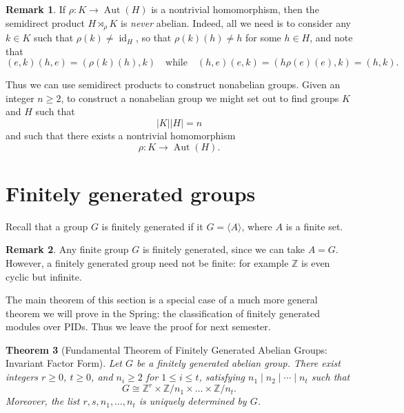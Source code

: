 \documentclass[12pt]{report}
\newtheorem{theorem}{Theorem}[chapter]
\numberwithin{equation}{section}
\numberwithin{theorem}{chapter}
\theoremstyle{definition}
\newtheorem*{basic properties}{Basic Properties}
\newtheorem*{Important Remark}{Important Remark}
\newtheorem{remark}[theorem]{Remark}
\newcommand{\Z}{\mathbb{Z}}
\def\sdp{\rtimes}
\DeclareMathOperator{\id}{id}
\DeclareMathOperator{\Aut}{Aut}
\begin{document}
\begin{remark}\label{semidirect product nonabliean}
If $\rho\!: K \longrightarrow \Aut(H)$ is a nontrivial homomorphism, then the semidirect product $H \sdp_\rho K$ is \emph{never} abelian. Indeed, all we need is to consider any $k \in K$ such that $\rho(k) \neq \id_H$, so that $\rho(k)(h) \neq h$ for some $h \in H$, and note that
$$(e,k)(h,e) = (\rho(k)(h),k) \quad \text{while} \quad (h,e)(e,k) = (h\rho(e)(e),k) = (h,k).$$
\end{remark}




Thus we can use semidirect products to construct nonabelian groups. 
Given an integer $n \geqslant 2$, to construct a nonabelian group we might set out to find groups $K$ and $H$ such that
$$|K| |H| = n$$
and such that there exists a nontrivial homomorphism
$$\rho\!: K \to \Aut(H).$$


\section{Finitely generated groups}


Recall that a group $G$ is finitely generated if it $G=\langle A \rangle$, where $A$ is a finite set. 

\begin{remark}
Any finite group $G$ is finitely generated, since we can take $A=G$. However, a finitely generated group need not be finite: for example $\Z$ is even cyclic but infinite.
\end{remark}

The main theorem of this section is a special case of a much more general theorem we will prove in the Spring: the classification of finitely generated modules over PIDs. Thus we leave the proof for next semester.

\begin{theorem}[Fundamental Theorem of Finitely Generated Abelian Groups: Invariant Factor Form]\label{finitely generated abelian groups invariant factors} 
Let $G$ be a finitely generated abelian group. There exist integers $r \geqslant 0$, $t \geqslant 0$, and $n_i \geqslant 2$ for $1 \leqslant i \leqslant t$, satisfying $n_1 \mid n_2 \mid \cdots \mid n_t$ such that 
  $$
  G \cong \Z^r \times \Z/n_1 \times \dots \times \Z/n_t.
  $$
  Moreover, the list $r,s,n_1,\ldots , n_t$ is uniquely determined by $G$.
\end{theorem}
\end{document}
